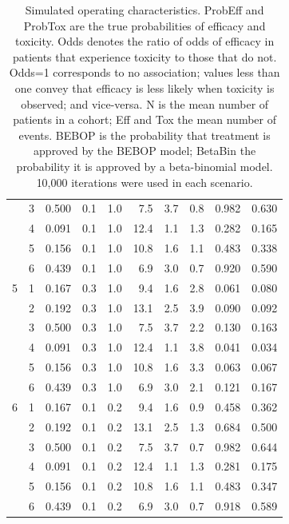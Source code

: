 \documentclass[alpha-refs]{wiley-article}
\begin{document}
\begin{table}[ht]
\begin{tabular}{rrrrrrrrrr}
   & 3 & 0.500 & 0.1 & 1.0 & 7.5 & 3.7 & 0.8 & 0.982 & 0.630 \\ 
   & 4 & 0.091 & 0.1 & 1.0 & 12.4 & 1.1 & 1.3 & 0.282 & 0.165 \\ 
   & 5 & 0.156 & 0.1 & 1.0 & 10.8 & 1.6 & 1.1 & 0.483 & 0.338 \\ 
   & 6 & 0.439 & 0.1 & 1.0 & 6.9 & 3.0 & 0.7 & 0.920 & 0.590 \\ 
   \hline
5 & 1 & 0.167 & 0.3 & 1.0 & 9.4 & 1.6 & 2.8 & 0.061 & 0.080 \\ 
   & 2 & 0.192 & 0.3 & 1.0 & 13.1 & 2.5 & 3.9 & 0.090 & 0.092 \\ 
   & 3 & 0.500 & 0.3 & 1.0 & 7.5 & 3.7 & 2.2 & 0.130 & 0.163 \\ 
   & 4 & 0.091 & 0.3 & 1.0 & 12.4 & 1.1 & 3.8 & 0.041 & 0.034 \\ 
   & 5 & 0.156 & 0.3 & 1.0 & 10.8 & 1.6 & 3.3 & 0.063 & 0.067 \\ 
   & 6 & 0.439 & 0.3 & 1.0 & 6.9 & 3.0 & 2.1 & 0.121 & 0.167 \\ 
   \hline
6 & 1 & 0.167 & 0.1 & 0.2 & 9.4 & 1.6 & 0.9 & 0.458 & 0.362 \\ 
   & 2 & 0.192 & 0.1 & 0.2 & 13.1 & 2.5 & 1.3 & 0.684 & 0.500 \\ 
   & 3 & 0.500 & 0.1 & 0.2 & 7.5 & 3.7 & 0.7 & 0.982 & 0.644 \\ 
   & 4 & 0.091 & 0.1 & 0.2 & 12.4 & 1.1 & 1.3 & 0.281 & 0.175 \\ 
   & 5 & 0.156 & 0.1 & 0.2 & 10.8 & 1.6 & 1.1 & 0.483 & 0.347 \\ 
   & 6 & 0.439 & 0.1 & 0.2 & 6.9 & 3.0 & 0.7 & 0.918 & 0.589 \\ 
   \hline
\end{tabular}
\caption{Simulated operating characteristics. 
ProbEff and ProbTox are the true probabilities of efficacy and toxicity.
Odds denotes the ratio of odds of efficacy in patients that experience toxicity to those that do not.
Odds=1 corresponds to no association; values less than one convey that efficacy is less likely when toxicity is observed; and vice-versa.
N is the mean number of patients in a cohort; Eff and Tox the mean number of events.
BEBOP is the probability that treatment is approved by the BEBOP model; 
BetaBin the probability it is approved by a beta-binomial model.
10,000 iterations were used in each scenario.} 
\label{tab:ocs}
\end{table}
\end{document}
